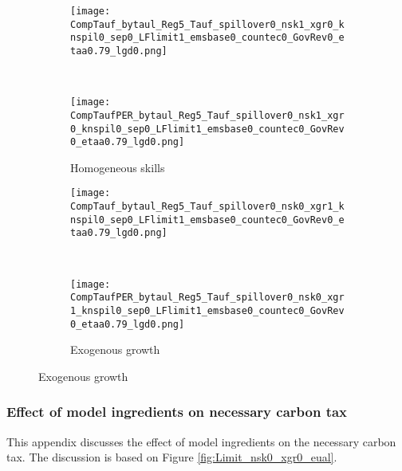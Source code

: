 \begin{figure}[h!!]
	\begin{subfigure}{0.7\textwidth}
		\caption{Homogeneous skills}
		\begin{minipage}[]{0.45\textwidth}
			\texttt{[image: CompTauf\_bytaul\_Reg5\_Tauf\_spillover0\_nsk1\_xgr0\_knspil0\_sep0\_LFlimit1\_emsbase0\_countec0\_GovRev0\_etaa0.79\_lgd0.png]}
		\end{minipage}\begin{minipage}[]{0.05\textwidth}
		\
	\end{minipage}		
		\begin{minipage}[]{0.45\textwidth}
			\texttt{[image: CompTaufPER\_bytaul\_Reg5\_Tauf\_spillover0\_nsk1\_xgr0\_knspil0\_sep0\_LFlimit1\_emsbase0\_countec0\_GovRev0\_etaa0.79\_lgd0.png]} 
		\end{minipage}	
	\end{subfigure}		
	
	\begin{subfigure}{0.7\textwidth}
		\caption{Exogenous growth}
		\begin{minipage}[]{0.45\textwidth}
			\texttt{[image: CompTauf\_bytaul\_Reg5\_Tauf\_spillover0\_nsk0\_xgr1\_knspil0\_sep0\_LFlimit1\_emsbase0\_countec0\_GovRev0\_etaa0.79\_lgd0.png]}
		\end{minipage}\begin{minipage}[]{0.05\textwidth}
		\
	\end{minipage}		
		\begin{minipage}[]{0.45\textwidth}
			\texttt{[image: CompTaufPER\_bytaul\_Reg5\_Tauf\_spillover0\_nsk0\_xgr1\_knspil0\_sep0\_LFlimit1\_emsbase0\_countec0\_GovRev0\_etaa0.79\_lgd0.png]} 
		\end{minipage}	
	\end{subfigure}
\end{figure}
\clearpage

\subsubsection{Effect of model ingredients on necessary carbon tax}\label{app:modvar}

This appendix discusses the effect of model ingredients on the necessary carbon tax. The discussion is based on Figure \ref{fig:Limit_nsk0_xgr0_eual}.


